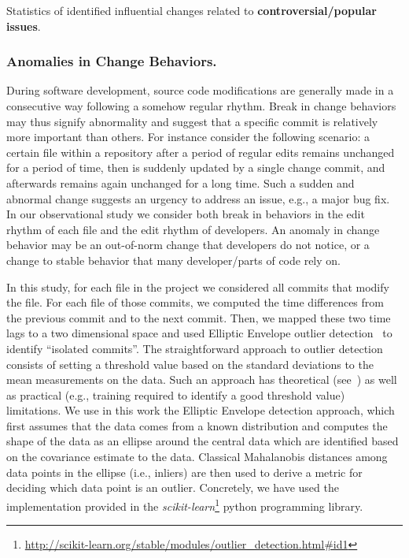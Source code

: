 \begin{table}[h!]
\centering
\caption{Statistics of identified influential changes related to {\bf controversial/popular issues}.}

\label{tab:blocking}
\end{table}


\subsubsection{Anomalies in Change Behaviors.}
\label{sec:isolated}

During software development, source code modifications
are generally made in a consecutive way following a somehow regular rhythm.
Break in change behaviors may thus signify abnormality and suggest
that a specific commit is relatively more important than others. 
For instance consider the following scenario: a certain file within a repository
after a period of regular edits remains unchanged for a period
of time, then is suddenly updated by a single change commit, and afterwards
remains again unchanged for a long time. Such a sudden and abnormal change 
suggests an urgency to address an issue, e.g., a major bug fix.
In our observational study we consider both break in behaviors in the edit rhythm
of each file and the edit rhythm of developers.
An anomaly in change behavior may be an out-of-norm change that developers do not notice,
 or a change to stable behavior that many developer/parts of code rely on.

In this study, for each file in the project we considered all commits that
modify the file. For each file of those commits, we computed the time differences
from the previous commit and to the next commit. Then, we mapped these two time
lags to a two dimensional space and used Elliptic Envelope outlier detection~\cite{rousseeuw1999fast} to
identify ``isolated commits''. The straightforward approach to outlier detection consists
of setting a threshold value based on the standard deviations to the mean measurements on the data. Such
an approach has theoretical (see~\cite{LEYS2013764}) as well as practical (e.g., training required to identify a good threshold value) limitations. We use in this work the Elliptic Envelope detection approach, which first assumes that the data comes from a known distribution and computes the shape of the data as an ellipse around the central data which are 
identified based on the covariance estimate to the data. Classical Mahalanobis distances among data points in
the ellipse (i.e., inliers) are then used to derive a metric for deciding which data point is an outlier. 
Concretely, we have used the implementation provided in the {\it scikit-learn}\footnote{\url{http://scikit-learn.org/stable/modules/outlier\_detection.html\#id1}} python programming library.

